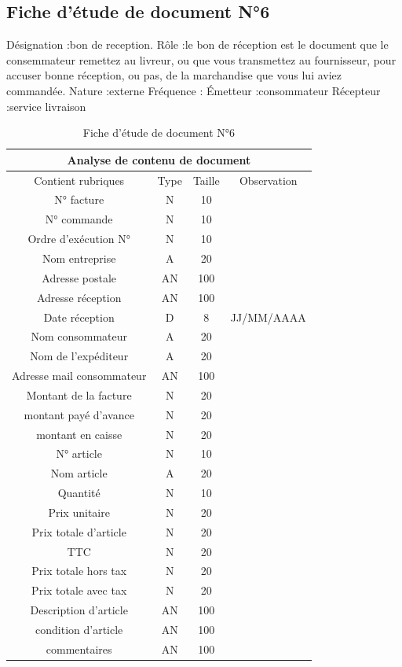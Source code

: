 \documentclass[edit,12pt,a4paper,ChapStyle,oneside,doubleinterligne]{report}
\begin{document}
\newpage
\subsection{Fiche d’étude de document N°6}
Désignation :bon de reception.
\newline Rôle :le bon de réception est le document que le consemmateur remettez au livreur, ou que vous transmettez au fournisseur, pour accuser bonne réception, ou pas, de la marchandise que vous lui aviez commandée.
\newline Nature :externe
\newline Fréquence :
\newline Émetteur :consommateur
\newline Récepteur :service livraison \cite{bonr}
\begin{table}[h!]
    \centering
    \begin{tabular}{|c|c|c|c|}
         \hline
\multicolumn{4}{|c|}{Analyse de contenu de document}\\
\hline
Contient rubriques & Type & Taille & Observation\\
\hline
 N° facture  & N & 10 & \\
 N° commande  & N & 10 & \\
 Ordre d’exécution N° & N & 10 & \\
 Nom entreprise & A & 20 & \\
 Adresse postale & AN & 100 & \\
 Adresse réception & AN & 100 & \\
Date réception & D & 8 & JJ/MM/AAAA \\
Nom consommateur & A & 20 & \\
Nom de l'expéditeur & A & 20 & \\
Adresse mail consommateur & AN & 100 & \\
Montant de la facture & N & 20 & \\
montant payé d'avance & N & 20 & \\
montant en caisse & N & 20 & \\
N° article & N & 10 & \\
Nom article & A & 20 & \\
Quantité & N & 10 & \\
Prix unitaire & N & 20 & \\
Prix totale d’article & N & 20 & \\
TTC & N & 20 & \\
Prix totale hors tax & N & 20 & \\
Prix totale avec tax & N & 20 & \\
Description d’article & AN & 100 & \\
condition d’article & AN & 100 & \\
commentaires & AN & 100 & \\
\hline
    \end{tabular}
    \caption{Fiche d’étude de document N°6}
    \label{tab:6}
\end{table}
\newpage
\end{document}
